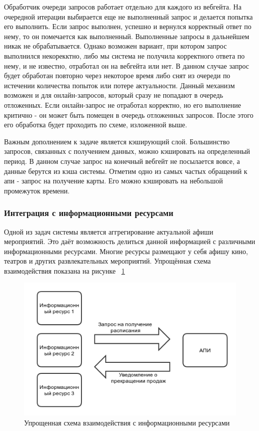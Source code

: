 Обработчик очереди запросов работает отдельно для каждого из вебгейта. На очередной итерации выбирается еще не выполненный запрос и делается попытка его выполнить. Если запрос выполнен, успешно и вернулся корректный ответ по нему, то он помечается как выполненный. Выполненные запросы в дальнейшем никак не обрабатывается. Однако возможен вариант, при котором запрос выполнился некорекктно, либо мы система не получила корректного ответа по нему, и не известно, отработал он на вебгейта или нет. В данном случае запрос будет обработан повторно через некоторое время либо снят из очереди по истечении количества попыток или потере актуальности. Данный механизм возможен и для онлайн-запросов, который сразу не попадают в очередь отложенных. Если онлайн-запрос не отработал корректно, но его выполнение критично - он может быть помещен в очередь отложенных запросов. После этого его обработка будет проходить по схеме, изложенной выше.

Важным дополнением к задаче является кэширующий слой. Большинство запросов, связанных с получением данных, можно кэшировать на определенный период. В данном случае запрос на конечный вебгейт не посылается вовсе, а данные берутся из кэша системы. Отметим одно из самых частых обращений к апи - запрос на получение карты. Его можно кэшировать на небольшой промежуток времени.


\subsubsection{Интеграция с информационными ресурсами}

Одной из задач системы является аггрегирование актуальной афиши мероприятий. Это даёт возможность делиться данной информацией с различными информационными ресурсами. Многие ресурсы размещают у себя афишу кино, театров и других развлекательных мероприятий. Упрощённая схема взаимодействия показана на рисунке ~\ref{fig:ir-schema}

\begin{figure}[H]
  	\centering
 	\includegraphics[width=1\textwidth]{images/ir-schema.png}
  	\caption{Упрощенная схема взаимодействия с информационными ресурсами}
    \label{fig:ir-schema}
\end{figure}


